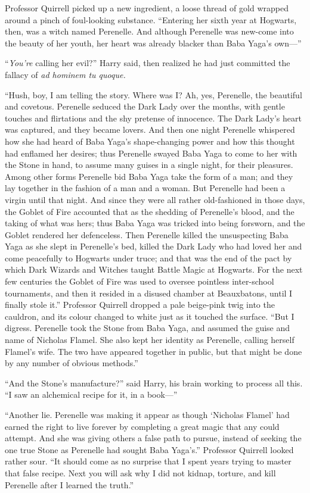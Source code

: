 Professor Quirrell picked up a new ingredient, a loose thread of gold wrapped
around a pinch of foul-looking substance. “Entering her sixth year at Hogwarts,
then, was a witch named Perenelle. And although Perenelle was new-come into the
beauty of her youth, her heart was already blacker than Baba Yaga’s own—”

“\emph{You’re} calling her evil?” Harry said, then realized he had just
committed the fallacy of \emph{ad hominem tu quoque.}

“Hush, boy, I am telling the story. Where was I? Ah, yes, Perenelle, the
beautiful and covetous. Perenelle seduced the Dark Lady over the months, with
gentle touches and flirtations and the shy pretense of innocence. The Dark
Lady’s heart was captured, and they became lovers. And then one night Perenelle
whispered how she had heard of Baba Yaga’s shape-changing power and how this
thought had enflamed her desires; thus Perenelle swayed Baba Yaga to come to
her with the Stone in hand, to assume many guises in a single night, for their
pleasures. Among other forms Perenelle bid Baba Yaga take the form of a man;
and they lay together in the fashion of a man and a woman. But Perenelle had
been a virgin until that night. And since they were all rather old-fashioned in
those days, the Goblet of Fire accounted that as the shedding of Perenelle’s
blood, and the taking of what was hers; thus Baba Yaga was tricked into being
forsworn, and the Goblet rendered her defenceless. Then Perenelle killed the
unsuspecting Baba Yaga as she slept in Perenelle’s bed, killed the Dark Lady
who had loved her and come peacefully to Hogwarts under truce; and that was the
end of the pact by which Dark Wizards and Witches taught Battle Magic at
Hogwarts. For the next few centuries the Goblet of Fire was used to oversee
pointless inter-school tournaments, and then it resided in a disused chamber at
Beauxbatons, until I finally stole it.” Professor Quirrell dropped a pale
beige-pink twig into the cauldron, and its colour changed to white just as it
touched the surface. “But I digress. Perenelle took the Stone from Baba Yaga,
and assumed the guise and name of Nicholas Flamel. She also kept her identity
as Perenelle, calling herself Flamel’s wife. The two have appeared together in
public, but that might be done by any number of obvious methods.”

“And the Stone’s manufacture?” said Harry, his brain working to process all
this. “I saw an alchemical recipe for it, in a book—”

“Another lie. Perenelle was making it appear as though ‘Nicholas Flamel’ had
earned the right to live forever by completing a great magic that any could
attempt. And she was giving others a false path to pursue, instead of seeking
the one true Stone as Perenelle had sought Baba Yaga’s.” Professor Quirrell
looked rather sour. “It should come as no surprise that I spent years trying to
master that false recipe. Next you will ask why I did not kidnap, torture, and
kill Perenelle after I learned the truth.”


